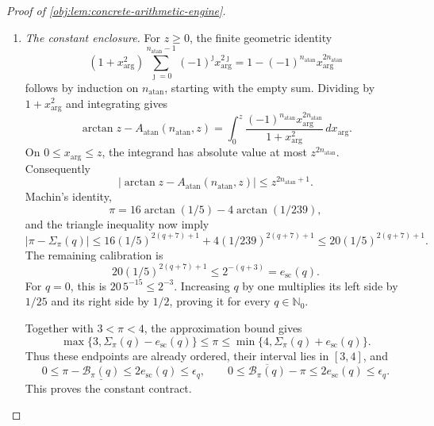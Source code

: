 \documentclass[11pt]{article}
\begin{document}
\begin{proof}[Proof of \cref{obj:lem:concrete-arithmetic-engine}]
\begin{enumerate}
\item \emph{The constant enclosure.}
For \(z\ge0\), the finite geometric identity
\[
(1+x_{\mathrm{arg}}^2)
 \sum_{\jmath=0}^{n_{\mathrm{atan}}-1}
       (-1)^\jmath x_{\mathrm{arg}}^{2\jmath}
 =
1-(-1)^{n_{\mathrm{atan}}}
       x_{\mathrm{arg}}^{2n_{\mathrm{atan}}}
\]
follows by induction on \(n_{\mathrm{atan}}\), starting with the empty sum. Dividing by \(1+x_{\mathrm{arg}}^2\) and integrating gives
\[
\arctan z-A_{\mathrm{atan}}(n_{\mathrm{atan}},z)
 =
\int_0^z
 \frac{(-1)^{n_{\mathrm{atan}}}
        x_{\mathrm{arg}}^{2n_{\mathrm{atan}}}}
      {1+x_{\mathrm{arg}}^2}\,dx_{\mathrm{arg}}.
\]
On \(0\le x_{\mathrm{arg}}\le z\), the integrand has absolute value at most
\(z^{2n_{\mathrm{atan}}}\). Consequently
\[
|\arctan z-A_{\mathrm{atan}}(n_{\mathrm{atan}},z)|
 \le z^{2n_{\mathrm{atan}}+1}.
\]
Machin's identity,
\[
\pi=16\arctan(1/5)-4\arctan(1/239),
\]
and the triangle inequality now imply
\[
|\pi-\Sigma_\pi(q)|
 \le16(1/5)^{2(q+7)+1}
    +4(1/239)^{2(q+7)+1}
 \le20(1/5)^{2(q+7)+1}.
\]
The remaining calibration is
\[
20(1/5)^{2(q+7)+1}\le2^{-(q+3)}=e_{\mathrm{sc}}(q).
\]
For \(q=0\), this is \(20\,5^{-15}\le2^{-3}\). Increasing \(q\) by one multiplies its left side by \(1/25\) and its right side by \(1/2\), proving it for every \(q\in\mathbb N_0\).

Together with \(3<\pi<4\), the approximation bound gives
\[
\max\{3,\Sigma_\pi(q)-e_{\mathrm{sc}}(q)\}
 \le\pi\le
\min\{4,\Sigma_\pi(q)+e_{\mathrm{sc}}(q)\}.
\]
Thus these endpoints are already ordered, their interval lies in \([3,4]\), and
\[
0\le\pi-\underline{\mathcal B_\pi(q)}
 \le2e_{\mathrm{sc}}(q)\le\epsilon_q,
\qquad
0\le\overline{\mathcal B_\pi(q)}-\pi
 \le2e_{\mathrm{sc}}(q)\le\epsilon_q.
\]
This proves the constant contract.


\end{enumerate}
\end{proof}
\end{document}
